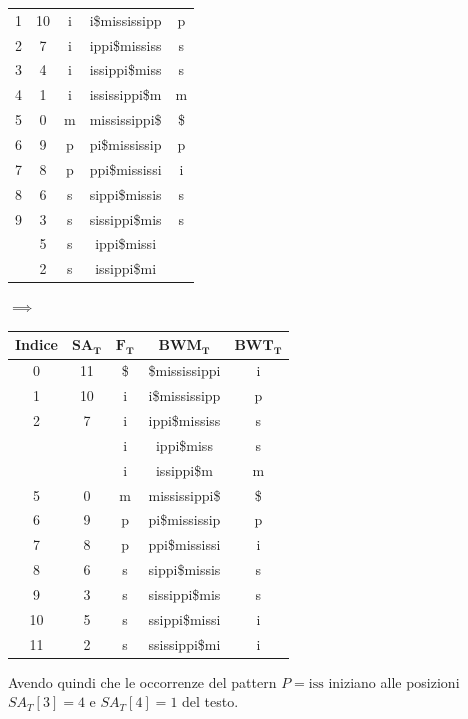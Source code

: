 \begin{esempio}
\begin{table}[H]
\begin{tabular}{c|c|c|c|c}
      1 & 10 & i & i\$mississipp & p\\
      2 & 7 & i & ippi\$mississ & s\\
      3 & 4 & i & issippi\$miss & s\\
      4 & 1 & i & ississippi\$m & m\\
      5 & 0 & m & mississippi\$ & \$\\
      6 & 9 & p & pi\$mississip & p\\
      7 & 8 & p & ppi\$mississi & i\\
      8 & 6 & s & sippi\$missis & s\\
      9 & 3 & s & sissippi\$mis & s\\
      {\color{nordred}{10}} & 5 & s & {\color{nordred}{ss}}ippi\$missi
      & {\color{nordgreen}{i}}\\
      {\color{nordred}{11}} & 2 & s & {\color{nordred}{ss}}issippi\$mi
      & {\color{nordgreen}{i}}\\
    \end{tabular}
    $\implies$
    \begin{tabular}{c|c|c|c|c} 
      \textbf{Indice} & $\mathbf{SA_T}$ & $\mathbf{F_T}$ & $\mathbf{BWM_T}$
      & $\mathbf{BWT_T}$\\ 
      \hline
      0 & 11 & \$ & \$mississippi & i\\
      1 & 10 & i & i\$mississipp & p\\
      2 & 7 & i & ippi\$mississ & s\\
      {\color{nordred}{3}} & {\color{nordgreen}{\underline{4}}} & i
                                        & {\color{nordred}{iss}}ippi\$miss & s\\
      {\color{nordred}{4}} & {\color{nordgreen}{\underline{1}}} & i
                                        & {\color{nordred}{iss}}issippi\$m & m\\
      5 & 0 & m & mississippi\$ & \$\\
      6 & 9 & p & pi\$mississip & p\\
      7 & 8 & p & ppi\$mississi & i\\
      8 & 6 & s & sippi\$missis & s\\
      9 & 3 & s & sissippi\$mis & s\\
      10 & 5 & s & ssippi\$missi & i\\
      11 & 2 & s & ssissippi\$mi & i\\
    \end{tabular}
  \end{table}
  Avendo quindi che le occorrenze del pattern $P=\mbox{iss}$ iniziano alle
  posizioni $SA_T[3]=4$ e $SA_T[4]=1$ del testo.
\end{esempio}
